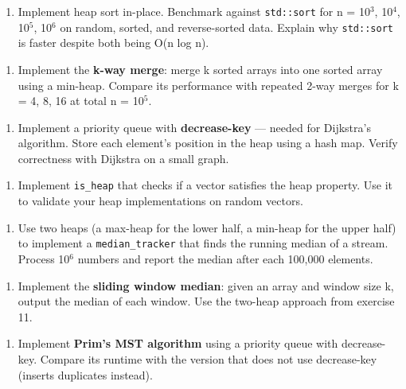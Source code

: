 \begin{enumerate}
\item Implement heap sort in-place. Benchmark against \texttt{std::sort} for n = 10$^{3}$, 10$^{4}$, 10$^{5}$, 10$^{6}$ on random, sorted, and reverse-sorted data. Explain why \texttt{std::sort} is faster despite both being O(n log n).
\end{enumerate}

\begin{enumerate}
\item Implement the \textbf{k-way merge}: merge k sorted arrays into one sorted array using a min-heap. Compare its performance with repeated 2-way merges for k = 4, 8, 16 at total n = 10$^{5}$.
\end{enumerate}

\begin{enumerate}
\item Implement a priority queue with \textbf{decrease-key} — needed for Dijkstra's algorithm. Store each element's position in the heap using a hash map. Verify correctness with Dijkstra on a small graph.
\end{enumerate}

\begin{enumerate}
\item Implement \texttt{is\_heap} that checks if a vector satisfies the heap property. Use it to validate your heap implementations on random vectors.
\end{enumerate}

\begin{enumerate}
\item Use two heaps (a max-heap for the lower half, a min-heap for the upper half) to implement a \texttt{median\_tracker} that finds the running median of a stream. Process 10$^{6}$ numbers and report the median after each 100,000 elements.
\end{enumerate}

\begin{enumerate}
\item Implement the \textbf{sliding window median}: given an array and window size k, output the median of each window. Use the two-heap approach from exercise 11.
\end{enumerate}

\begin{enumerate}
\item Implement \textbf{Prim's MST algorithm} using a priority queue with decrease-key. Compare its runtime with the version that does not use decrease-key (inserts duplicates instead).
\end{enumerate}

